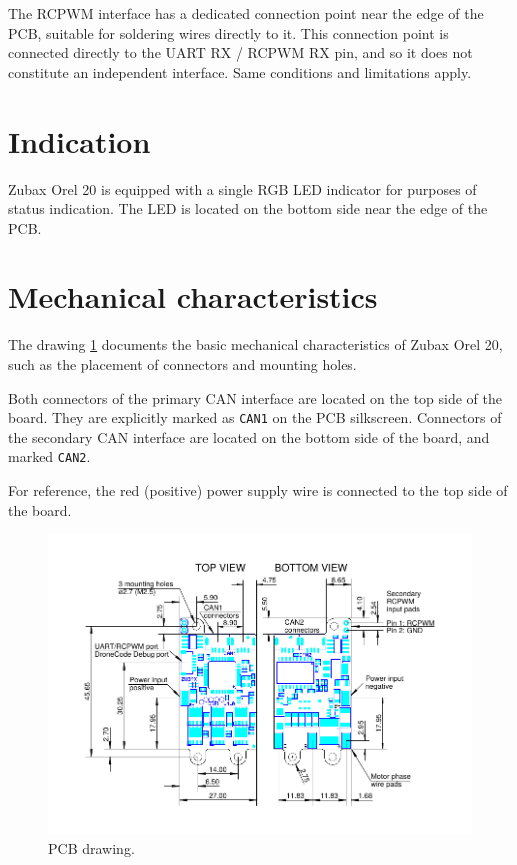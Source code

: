 \documentclass{zubaxdoc}
\begin{document}
The RCPWM interface has a dedicated connection point near the edge of the PCB,
suitable for soldering wires directly to it.
This connection point is connected directly to the UART RX / RCPWM RX pin,
and so it does not constitute an independent interface.
Same conditions and limitations apply.

\section{Indication}

Zubax Orel 20 is equipped with a single RGB LED indicator for purposes of status indication.
The LED is located on the bottom side near the edge of the PCB.

\section{Mechanical characteristics}

The drawing \ref{drawing} documents the basic mechanical characteristics of Zubax Orel 20,
such as the placement of connectors and mounting holes.

Both connectors of the primary CAN interface are located on the top side of the board.
They are explicitly marked as \verb|CAN1| on the PCB silkscreen.
Connectors of the secondary CAN interface are located on the bottom side of the board,
and marked \verb|CAN2|.

For reference, the red (positive) power supply wire is connected to the top side of the board.

\begin{figure}[!hbt]
	\centerline{\includegraphics[width=1.1\textwidth]{drawing}}
	\caption{PCB drawing.\label{drawing}}
\end{figure}
\end{document}
